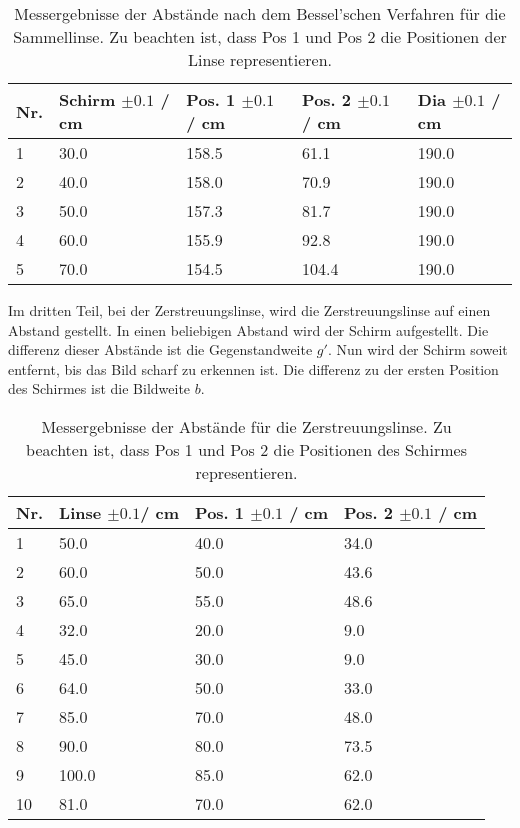 \documentclass[12pt,a4paper,twoside]{article}
\begin{document}
\begin{table}[H]
    \centering
    \caption{Messergebnisse der Abstände nach dem Bessel'schen Verfahren für die Sammellinse. Zu beachten ist, dass Pos 1 und Pos 2 die Positionen der Linse representieren. }
    \label{tab:messergebnisse Bessel}
    \begin{tabular}{| l | l | l | l | l |}
        \hline
        Nr.  & Schirm $\pm 0.1 $ / cm &  Pos. 1 $\pm 0.1 $ / cm & Pos. 2 $\pm 0.1 $ / cm & Dia $\pm 0.1 $ / cm \\
        \hline
        1  & 30.0   & 158.5 & 61.1  & 190.0 \\
        2  & 40.0   & 158.0 & 70.9  & 190.0 \\
        3  & 50.0   & 157.3 & 81.7  & 190.0 \\
        4  & 60.0   & 155.9 & 92.8  & 190.0 \\
        5  & 70.0   & 154.5 & 104.4 & 190.0 \\
        \hline
    \end{tabular}
\end{table}

\noindent
Im dritten Teil, bei der Zerstreuungslinse, wird die Zerstreuungslinse auf einen Abstand gestellt. In einen beliebigen Abstand wird der Schirm aufgestellt. 
Die differenz dieser Abstände ist die Gegenstandweite $g'$. Nun wird der Schirm soweit entfernt, bis das Bild scharf zu erkennen ist. 
Die differenz zu der ersten Position des Schirmes ist die Bildweite $b$. 

\begin{table}[H]
    \centering
    \caption{Messergebnisse der Abstände für die Zerstreuungslinse. Zu beachten ist, dass Pos 1 und Pos 2 die Positionen des Schirmes representieren. }
    \label{tab:messergebnisse Zerstreuungslinse}
    \begin{tabular}{| l | l | l | l |}
        \hline
        Nr.  & Linse $\pm 0.1 $/ cm & Pos. 1 $\pm 0.1 $ / cm & Pos. 2 $\pm 0.1 $ / cm \\
        \hline
        1  & 50.0   & 40.0 & 34.0 \\
        2  & 60.0   & 50.0 & 43.6 \\
        3  & 65.0   & 55.0 & 48.6 \\
        4  & 32.0   & 20.0 & 9.0  \\
        5  & 45.0   & 30.0 & 9.0  \\
        6  & 64.0   & 50.0 & 33.0 \\
        7  & 85.0   & 70.0 & 48.0 \\
        8  & 90.0   & 80.0 & 73.5 \\
        9  & 100.0  & 85.0 & 62.0 \\
        10 & 81.0   & 70.0 & 62.0 \\
        \hline
    \end{tabular}
\end{table}
\end{document}
